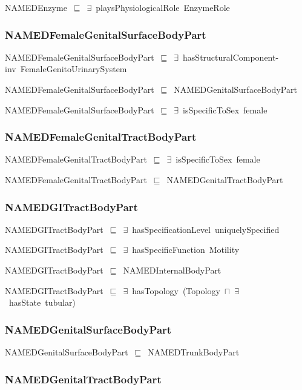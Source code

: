 \documentclass{article}
\begin{document}
NAMEDEnzyme~\ensuremath{\sqsubseteq}~\ensuremath{\exists}~playsPhysiologicalRole~EnzymeRole~

\subsubsection*{NAMEDFemaleGenitalSurfaceBodyPart}

NAMEDFemaleGenitalSurfaceBodyPart~\ensuremath{\sqsubseteq}~\ensuremath{\exists}~hasStructuralComponent-inv~FemaleGenitoUrinarySystem~

NAMEDFemaleGenitalSurfaceBodyPart~\ensuremath{\sqsubseteq}~NAMEDGenitalSurfaceBodyPart~

NAMEDFemaleGenitalSurfaceBodyPart~\ensuremath{\sqsubseteq}~\ensuremath{\exists}~isSpecificToSex~female~

\subsubsection*{NAMEDFemaleGenitalTractBodyPart}

NAMEDFemaleGenitalTractBodyPart~\ensuremath{\sqsubseteq}~\ensuremath{\exists}~isSpecificToSex~female~

NAMEDFemaleGenitalTractBodyPart~\ensuremath{\sqsubseteq}~NAMEDGenitalTractBodyPart~

\subsubsection*{NAMEDGITractBodyPart}

NAMEDGITractBodyPart~\ensuremath{\sqsubseteq}~\ensuremath{\exists}~hasSpecificationLevel~uniquelySpecified~

NAMEDGITractBodyPart~\ensuremath{\sqsubseteq}~\ensuremath{\exists}~hasSpecificFunction~Motility~

NAMEDGITractBodyPart~\ensuremath{\sqsubseteq}~NAMEDInternalBodyPart~

NAMEDGITractBodyPart~\ensuremath{\sqsubseteq}~\ensuremath{\exists}~hasTopology~(Topology~\ensuremath{\sqcap}~\ensuremath{\exists}~hasState~tubular)~

\subsubsection*{NAMEDGenitalSurfaceBodyPart}

NAMEDGenitalSurfaceBodyPart~\ensuremath{\sqsubseteq}~NAMEDTrunkBodyPart~

\subsubsection*{NAMEDGenitalTractBodyPart}
\end{document}
